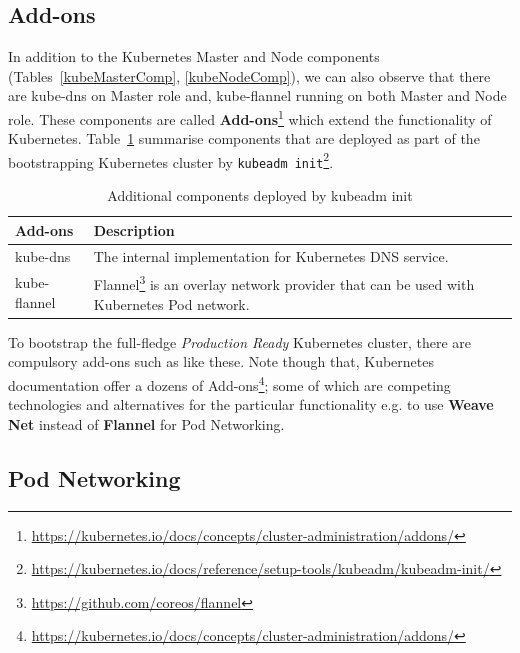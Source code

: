 \subsection{Add-ons}

In addition to the Kubernetes Master and Node components (Tables~\ref{kubeMasterComp}, \ref{kubeNodeComp}), we can also observe that there are kube-dns on Master role and, kube-flannel running on both Master and Node role. These components are called \textbf{Add-ons}\footnote{\url{https://kubernetes.io/docs/concepts/cluster-administration/addons/}} which extend the functionality of Kubernetes. Table~\ref{kubeadmAddons} summarise components that are deployed as part of the bootstrapping Kubernetes cluster by \verb|kubeadm init|\footnote{\url{https://kubernetes.io/docs/reference/setup-tools/kubeadm/kubeadm-init/}}.

\begin{table}[H]
\centering
    \begin{tabular}{ | l | p{11cm} |}
    \hline
    Add-ons & Description \\ \hline
    kube-dns & The internal implementation for Kubernetes DNS service. \\ \hline
    kube-flannel & Flannel\footnote{\url{https://github.com/coreos/flannel}} is an overlay network provider that can be used with Kubernetes Pod network. \\ 
    \hline
    \end{tabular}
\caption{Additional components deployed by kubeadm init}
\label{kubeadmAddons}  
\end{table}

\noindent To bootstrap the full-fledge \emph{Production Ready} Kubernetes cluster, there are compulsory add-ons such as like these. Note though that, Kubernetes documentation \parencite{kubeDoc} offer a dozens of Add-ons\footnote{\url{https://kubernetes.io/docs/concepts/cluster-administration/addons/}}; some of which are competing technologies and alternatives for the particular functionality e.g. to use \textbf{Weave Net} instead of \textbf{Flannel} for Pod Networking.

\subsection{Pod Networking}

